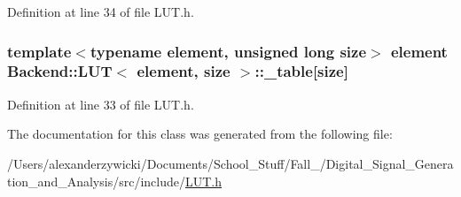 Definition at line 34 of file L\+U\+T.\+h.

\hypertarget{class_backend_1_1_l_u_t_ae70f3f0c9aaa9e0b85517d8e2c61d9a5}{
\subsubsection[{\+\_\+table}]{\setlength{\rightskip}{0pt plus 5cm}template$<$typename element, unsigned long size$>$ element {\bf Backend\+::\+L\+U\+T}$<$ element, size $>$\+::\+\_\+table\mbox{[}size\mbox{]}\hspace{0.3cm}{\ttfamily [protected]}}}\label{class_backend_1_1_l_u_t_ae70f3f0c9aaa9e0b85517d8e2c61d9a5}


Definition at line 33 of file L\+U\+T.\+h.



The documentation for this class was generated from the following file\+:\begin{DoxyCompactItemize}
\item 
/\+Users/alexanderzywicki/\+Documents/\+School\+\_\+\+Stuff/\+Fall\+\_/\+Digital\+\_\+\+Signal\+\_\+\+Generation\+\_\+and\+\_\+\+Analysis/src/include/\hyperlink{_l_u_t_8h}{L\+U\+T.\+h}\end{DoxyCompactItemize}
